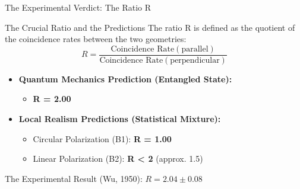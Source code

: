\begin{frame}{The Experimental Verdict: The Ratio R}

  \begin{block}{The Crucial Ratio and the Predictions}
    The ratio R is defined as the quotient of the coincidence rates between the two geometries:
    $$ R = \frac{\text{Coincidence Rate}(\text{parallel})}{\text{Coincidence Rate}(\text{perpendicular})} $$
    \begin{itemize}[<+->]
      \item \textbf{Quantum Mechanics Prediction (Entangled State):}
        \begin{itemize}
          \item \textbf{R = 2.00}
        \end{itemize}
      \item \textbf{Local Realism Predictions (Statistical Mixture):}
        \begin{itemize}
          \item Circular Polarization (B1): \textbf{R = 1.00}
          \item Linear Polarization (B2): \textbf{R < 2} (approx. 1.5)
        \end{itemize}
    \end{itemize}
  \end{block}

  \begin{alertblock}{The Experimental Result (Wu, 1950): $R = 2.04 \pm 0.08$}
  \end{alertblock}

\end{frame}
